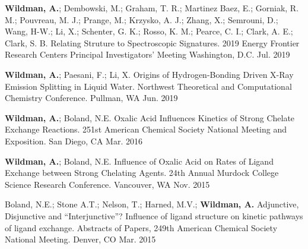 


\begin{cvpresentations}


\cvpresentation
{\textbf{Wildman, A.}; Dembowski, M.; Graham, T. R.; Martinez Baez, E.; Gorniak, R. M.; Pouvreau, M. J.; Prange, M.; Krzysko, A. J.; Zhang, X.; Semrouni, D.; Wang, H-W.; Li, X.; Schenter, G. K.; Rosso, K. M.; Pearce, C. I.; Clark, A. E.; Clark, S. B. Relating Struture to Spectroscopic Signatures. 2019 Energy Frontier Research Centers Principal Investigators' Meeting}
{Washington, D.C.} %
{Jul. 2019} %


\cvpresentation
{\textbf{Wildman, A.}; Paesani, F.; Li, X. Origins of Hydrogen-Bonding Driven X-Ray Emission Splitting in Liquid Water. Northwest Theoretical and Computational Chemistry Conference.} %
{Pullman, WA} %
{Jun. 2019} %


\cvpresentation
{\textbf{Wildman, A.}; Boland, N.E. Oxalic Acid Influences Kinetics of Strong Chelate Exchange Reactions. 251st American Chemical Society National Meeting and Exposition.} %
{San Diego, CA} %
{Mar. 2016} %


\cvpresentation
{\textbf{Wildman, A.}; Boland, N.E. Influence of Oxalic Acid on Rates of Ligand Exchange between Strong Chelating Agents. 24th Annual Murdock College Science Research Conference.} %
{Vancouver, WA} %
{Nov. 2015} %


\cvpresentation
{Boland, N.E.; Stone A.T.; Nelson, T.; Harned, M.V.; \textbf{Wildman, A.} Adjunctive, Disjunctive and “Interjunctive”? Influence of ligand structure on kinetic pathways of ligand exchange. Abstracts of Papers, 249th American Chemical Society National Meeting.} %
{Denver, CO} %
{Mar. 2015} %


\end{cvpresentations}
\vspace{-1cm}

